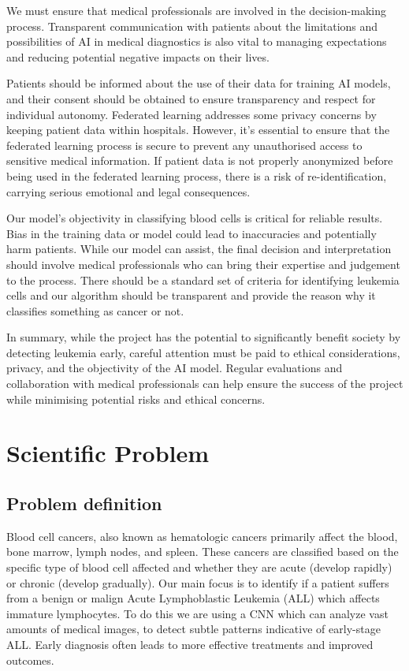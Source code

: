 \documentclass[runningheads,a4paper,11pt]{report}
\begin{document}
We must ensure that medical professionals are involved in the decision-making process. Transparent communication with patients about the limitations and possibilities of AI in medical diagnostics is also vital to managing expectations and reducing potential negative impacts on their lives.

Patients should be informed about the use of their data for training AI models, and their consent should be obtained to ensure transparency and respect for individual autonomy. Federated learning addresses some privacy concerns by keeping patient data within hospitals. However, it's essential to ensure that the federated learning process is secure to prevent any unauthorised access to sensitive medical information. If patient data is not properly anonymized before being used in the federated learning process, there is a risk of re-identification, carrying serious emotional and legal consequences.



Our model's objectivity in classifying blood cells is critical for reliable results. Bias in the training data or model could lead to inaccuracies and potentially harm patients. While our model can assist, the final decision and interpretation should involve medical professionals who can bring their expertise and judgement to the process. There should be a standard set of criteria for identifying leukemia cells and our algorithm should be transparent and provide the reason why it classifies something as cancer or not.

In summary, while the project has the potential to significantly benefit society by detecting leukemia early, careful attention must be paid to ethical considerations, privacy, and the objectivity of the AI model. Regular evaluations and collaboration with medical professionals can help ensure the success of the project while minimising potential risks and ethical concerns.

\chapter{Scientific Problem}
\label{section:scientificProblem}


\section{Problem definition}
\label{section:problemDefinition}

Blood cell cancers, also known as hematologic cancers primarily affect the blood, bone marrow, lymph nodes, and spleen. These cancers are classified based on the specific type of blood cell affected and whether they are acute (develop rapidly) or chronic (develop gradually). Our main focus is to identify if a patient suffers from a benign or malign  Acute Lymphoblastic Leukemia (ALL) which affects immature lymphocytes. To do this we are using a CNN which  can analyze vast amounts of medical images, to detect subtle patterns indicative of early-stage ALL. Early diagnosis often leads to more effective treatments and improved outcomes. 
\end{document}
